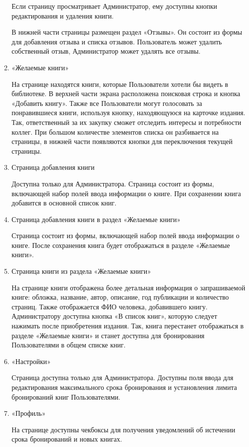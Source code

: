 \documentclass[project.tex]{subfiles}
\begin{document}
\begin{enumerate}
    \par
    Если страницу просматривает Администратор, ему доступны кнопки редактирования и удаления книги.
    \par
    В нижней части страницы размещен раздел «Отзывы». Он состоит из формы для добавления отзыва и списка отзывов. Пользователь может удалить собственный отзыв, Администратор может удалять все отзывы.
    \item «Желаемые книги»\\
    \par
    На странице находятся книги, которые Пользователи хотели бы видеть в библиотеке. В верхней части экрана расположена поисковая строка и кнопка «Добавить книгу». Также все Пользователи могут голосовать за понравившиеся книги, используя кнопку, находяющуюся на карточке издания. Так, ответственный за их закупку сможет отследить интересы и потребности коллег. 
    При большом количестве элементов списка он разбивается на страницы, в нижней части появляются кнопки для переключения текущей страницы.
    \item Страница добавления книги\\
    \par
    Доступна только для Администратора. Страница состоит из формы, включающей набор полей ввода информации о книге. При сохранении книга добавится в основной список книг.
    \item Страница добавления книги в раздел «Желаемые книги»\\
    \par
    Страница состоит из формы, включающей набор полей ввода информации о книге. После сохранения книга будет отображаться в разделе «Желаемые книги».
    \par
    \item Страница книги из раздела «Желаемые книги»\\
    \par
    На странице книги отображена более детальная информация о запрашиваемой книге: обложка, название, автор, описание, год публикации и количество страниц. Также отображается ФИО человека, добавившего книгу. Администратору доступна кнопка «В список книг», которую следует нажимать после приобретения издания. Так, книга перестанет отображаться в разделе «Желаемые книги» и станет доступна для бронирования Пользователями в общем списке книг.
    \item «Настройки»\\
    \par
    Страница доступна только для Администратора. Доступны поля ввода для редактирования максимального срока бронирования и установления лимита бронирований книг Пользователями.
    \item «Профиль»\\
    \par
    На странице доступны чекбоксы для получения уведомлений об истечении срока бронирований и новых книгах.
\end{enumerate}
\end{document}
